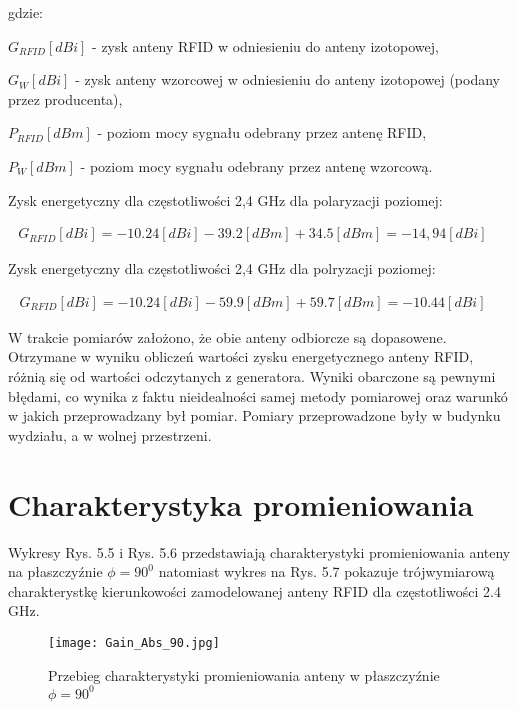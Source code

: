 \noindent
\newline gdzie: 

\noindent
\newline$G_{RFID}[dBi]$ - zysk anteny RFID w odniesieniu do anteny izotopowej, 


\noindent
\newline $G_{W}[dBi]$ - zysk anteny wzorcowej w odniesieniu do anteny izotopowej (podany przez producenta),

\noindent
\newline $P_{RFID}[dBm]$ - poziom mocy sygnału odebrany przez antenę RFID,


\noindent
\newline $P_W[dBm]$ - poziom mocy sygnału odebrany przez antenę wzorcową.

\noindent
\newline Zysk energetyczny dla częstotliwości 2,4 GHz dla polaryzacji poziomej:

\begin{align}
G_{RFID}[dBi] = -10.24[dBi] - 39.2[dBm] + 34.5[dBm] = -14,94[dBi]
\quad
\end{align}


\noindent
\newline Zysk energetyczny dla częstotliwości 2,4 GHz dla polryzacji poziomej:

\begin{align}
G_{RFID}[dBi] = -10.24[dBi] - 59.9[dBm] + 59.7[dBm] = -10.44[dBi]
\quad
\end{align}

W trakcie pomiarów założono, że obie anteny odbiorcze są dopasowene. Otrzymane w wyniku obliczeń wartości zysku energetycznego anteny RFID, różnią się od wartości odczytanych z generatora. Wyniki obarczone są pewnymi błędami, co wynika z faktu nieidealności samej metody pomiarowej oraz warunkó w jakich przeprowadzany był pomiar. Pomiary przeprowadzone były w budynku wydziału, a w wolnej przestrzeni.

\newpage
\section{Charakterystyka promieniowania}
Wykresy Rys. 5.5 i Rys. 5.6 przedstawiają charakterystyki promieniowania anteny na płaszczyźnie $\phi = 90^{0}$ natomiast wykres na Rys. 5.7 pokazuje trójwymiarową charakterystkę kierunkowości zamodelowanej anteny RFID dla częstotliwości 2.4 GHz.




\begin{figure}[h!]
\centering
	\texttt{[image: Gain\_Abs\_90.jpg]}
	\caption{Przebieg charakterystyki promieniowania anteny w płaszczyźnie $\phi = 90^{0}$}
\end{figure}

